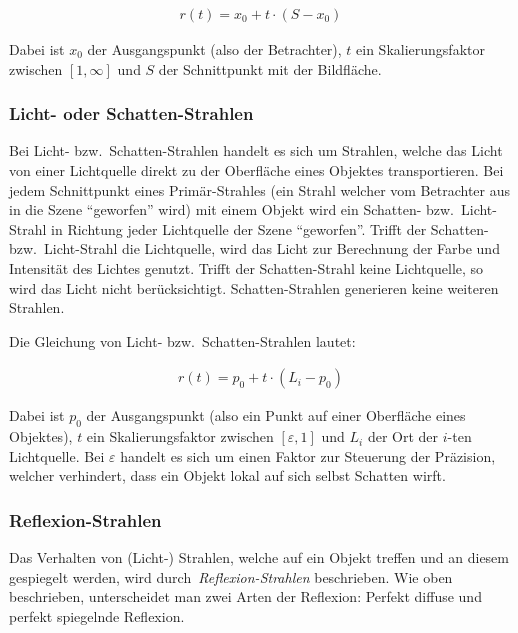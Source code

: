 \begin{gather}
    r(t) = x_{0} + t \cdot (S - x_{0})
\end{gather}

Dabei ist $x_{0}$ der Ausgangspunkt (also der Betrachter), $t$ ein
Skalierungsfaktor zwischen $[1, \infty]$ und $S$ der Schnittpunkt mit der
Bildfläche.

\subsubsection{Licht- oder Schatten-Strahlen}
\label{ssubsec:ray_tracing:shadow_rays}

Bei Licht- bzw.\ Schatten-Strahlen handelt es sich um Strahlen, welche
das Licht von einer Lichtquelle direkt zu der Oberfläche eines Objektes
transportieren. Bei jedem Schnittpunkt eines Primär-Strahles (ein Strahl
welcher vom Betrachter aus in die Szene ``geworfen'' wird) mit einem
Objekt wird ein Schatten- bzw.\ Licht-Strahl in Richtung jeder
Lichtquelle der Szene ``geworfen''. Trifft der Schatten- bzw.\
Licht-Strahl die Lichtquelle, wird das Licht zur Berechnung der Farbe
und Intensität des Lichtes genutzt. Trifft der Schatten-Strahl keine
Lichtquelle, so wird das Licht nicht berücksichtigt. Schatten-Strahlen
generieren keine weiteren Strahlen.

Die Gleichung von Licht- bzw.\ Schatten-Strahlen lautet:

\begin{gather}
    r(t) = p_{0} + t \cdot (L_{i} - p_{0})
\end{gather}

Dabei ist $p_{0}$ der Ausgangspunkt (also ein Punkt auf einer Oberfläche
eines Objektes), $t$ ein Skalierungsfaktor zwischen $[\varepsilon, 1]$ und
$L_{i}$ der Ort der $i$-ten Lichtquelle. Bei $\varepsilon$ handelt es
sich um einen Faktor zur Steuerung der Präzision, welcher verhindert,
dass ein Objekt lokal auf sich selbst Schatten wirft.

\subsubsection{Reflexion-Strahlen}
\label{ssubsec:ray_tracing:reflection_rays}

Das Verhalten von (Licht-) Strahlen, welche auf ein Objekt treffen und
an diesem gespiegelt werden, wird durch~\textit{Reflexion-Strahlen}
beschrieben. Wie oben beschrieben, unterscheidet man zwei Arten der
Reflexion: Perfekt diffuse und perfekt spiegelnde Reflexion.

